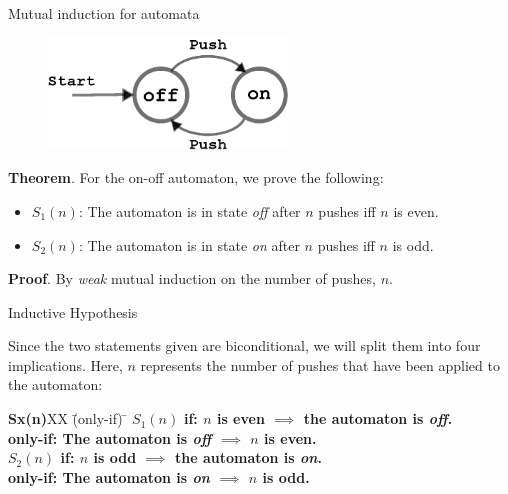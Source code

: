 \documentclass[style=sailor,size=12pt]{powerdot}
\begin{document}
\begin{wideslide}[bm=,toc=]{Mutual induction for automata}
\begin{figure}[h]
\centering
\includegraphics[width=2.5in, height=.75in,keepaspectratio=true]{switch.eps}
\label{2sp}
\end{figure}

{\bf Theorem}. For the on-off automaton, we prove the following: 
\begin{itemize}
\item $S_1(n)$: The automaton is in state {\em off\/} after $n$ pushes iff $n$ is even.

\item $S_2(n)$: The automaton is in state {\em on\/} after $n$ pushes iff $n$ is odd.
\end{itemize}
{\bf Proof}.  By {\em weak\/} mutual induction on the number of pushes, $n$. 

\end{wideslide}

\begin{wideslide}[bm=,toc=]{Inductive Hypothesis}

Since the two statements given are biconditional, we will split them into four
implications. Here, $n$ represents the number of pushes that have been applied to
the automaton:
\begin{tabbing}
{\bf Sx(n)}XX \=  (only-if) \= \kill
{\bf $S_1(n)$}  \>
           \bf{if:} \> 
          $n$ is even $\implies$ the automaton is {\em off\/}.   \\[2ex]
               \>
     \bf{only-if:}\> 
          The automaton is {\em off\/} $\implies$ $n$ is even.   \\[4ex]
{\bf $S_2(n)$} \>
          \bf{if:} \> 
        $n$ is odd $\implies$ the automaton is {\em on\/}. \\[2ex]
               \>
     \bf{only-if:} \> 
        The automaton is {\em on\/} $\implies$ $n$ is odd. \\[2ex]
\end{tabbing}

\end{wideslide}
\end{document}

